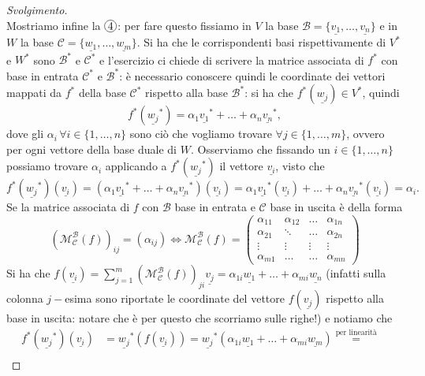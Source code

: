 \begin{proof}[Svolgimento]
$$    $$
    Mostriamo infine la $\circled{4}$: per fare questo fissiamo in $V$ la base $\mathcal{B}=\{\underline{v_1}, \ldots, \underline{v_n} \}$ e in $W$ la base $\mathcal{C}=\{\underline{w_1}, \ldots, \underline{w_m} \}$. Si ha che le corrispondenti basi rispettivamente di $V^\ast$ e $W^\ast$ sono $\mathcal{B}^\ast$ e $\mathcal{C}^\ast$ e l'esercizio ci chiede di scrivere la matrice associata di $f^\ast$ con base in entrata $\mathcal{C}^\ast$ e $\mathcal{B}^\ast$: è necessario conoscere quindi le coordinate dei vettori mappati da $f^\ast$ della base $\mathcal{C}^\ast$ rispetto alla base $\mathcal{B}^\ast$: si ha che $f^\ast(\underline{w_j}) \in V^\ast$, quindi
    $$
        f^\ast(\underline{w_j}^\ast) = \alpha_1 \underline{v_1}^\ast + \ldots + \alpha_n \underline{v_n}^\ast, 
    $$
    dove gli $\alpha_i \, \forall i \in \{ 1, \ldots, n \}$ sono ciò che vogliamo trovare $\forall j \in \{ 1, \ldots, m\}$, ovvero per ogni vettore della base duale di $W$. Osserviamo che fissando un $i \in \{ 1, \ldots, n\}$ possiamo trovare $\alpha_i$ applicando a $f^\ast(\underline{w_j}^\ast)$ il vettore $\underline{v_i}$, visto che
    $$
        f^\ast(\underline{w_j}^\ast)(\underline{v_i}) = (\alpha_1 \underline{v_1}^\ast + \ldots + \alpha_n \underline{v_n}^\ast)(\underline{v_i}) = \alpha_1 \underline{v_1}^\ast(\underline{v_i}) + \ldots + \alpha_n \underline{v_n}^\ast(\underline{v_i}) = \alpha_i.
    $$
    Se la matrice associata di $f$ con $\mathcal{B}$ base in entrata e $\mathcal{C}$ base in uscita è della forma
    $$
        (\mathcal{M}^\mathcal{B}_\mathcal{C}(f))_{ij} = (\alpha_{ij}) \iff \mathcal{M}^\mathcal{B}_\mathcal{C}(f) = \begin{pmatrix}
            \alpha_{11} & \alpha_{12} & \ldots & \alpha_{1n} \\
            \alpha_{21} & \ddots & \ldots & \alpha_{2n} \\
            \vdots & \vdots & \vdots & \vdots \\
            \alpha_{m1} & \ldots & \ldots & \alpha_{mn}
        \end{pmatrix}
    $$
    Si ha che $f(\underline{v_i}) = \sum\limits_{j=1}^m (\mathcal{M}^\mathcal{B}_\mathcal{C}(f))_{ji} \underline{v_j} = \alpha_{1i} \underline{w_1} + \ldots + \alpha_{mi} \underline{w_n}$ (infatti sulla colonna $j-$esima sono riportate le coordinate del vettore $f(\underline{v_j})$ rispetto alla base in uscita: notare che è per questo che scorriamo sulle righe!) e notiamo che
    \begin{align}
        f^\ast(\underline{w_j}^\ast)(\underline{v_i}) &= \underline{w_j}^\ast(f(\underline{v_i})) = \underline{w_j}^\ast(\alpha_{1i} \underline{w_1} + \ldots + \alpha_{mi} \underline{w_m}) \stackrel{\text{per linearità}}{=} & \\

\end{align}
\end{proof}
